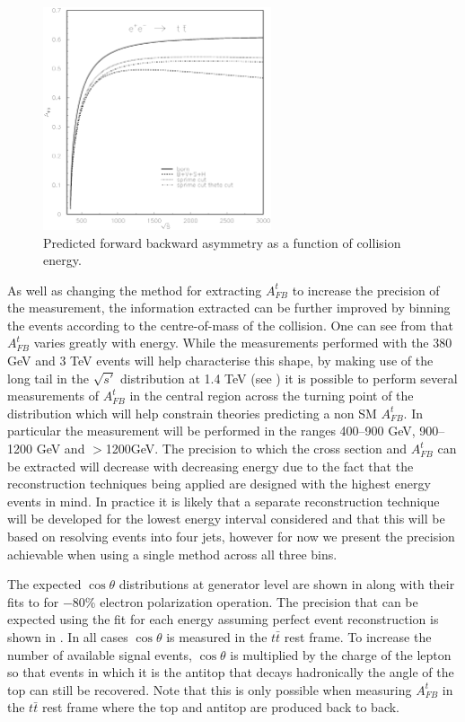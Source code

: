 \begin{figure}
  \centering
  \includegraphics[width=0.6\textwidth]{TopAnalysis/figures/asym-top.eps}
  \caption[Predicted forward backward asymmetry as a function of collision energy]{Predicted forward backward asymmetry as a function of collision energy\cite{Fleischer:2003kk}.}
  \label{fig:afbVEtheory}
\end{figure}

As well as changing the method for extracting $A_{FB}^t$ to increase the precision of the measurement, the information extracted can be further improved by binning the events according to the centre-of-mass of the collision. One can see from  that $A_{FB}^t$ varies greatly with energy. While the measurements performed with the 380 GeV and 3 TeV events will help characterise this shape, by making use of the long tail in the $\sqrt{s'}$ distribution at 1.4 TeV (see ) it is possible to perform several measurements of $A_{FB}^t$ in the central region across the turning point of the distribution which will help constrain theories predicting a non \ac{SM} $A_{FB}^t$. In particular the measurement will be performed in the ranges 400--900 GeV, 900--1200 GeV and $>$1200GeV. The precision to which the cross section  and $A_{FB}^t$ can be extracted will decrease with decreasing energy due to the fact that the reconstruction techniques being applied are designed with the highest energy events in mind. In practice it is likely that a separate reconstruction technique will be developed for the lowest energy interval considered and that this will be based on resolving events into four jets, however for now we present the precision achievable when using a single method across all three bins. 


The expected $\cos\theta$ distributions at generator level are shown in  along with their fits to  for $-$80\% electron polarization operation. The precision that can be expected using the fit for each energy assuming perfect event reconstruction is shown in . In all cases $\cos\theta$ is measured in the $t\bar{t}$ rest frame. To increase the number of available signal events, $\cos\theta$ is multiplied by the charge of the lepton so that events in which it is the antitop that decays hadronically the angle of the top can still be recovered. Note that this is only possible when measuring $A_{FB}^t$ in the $t\bar{t}$ rest frame where the top and antitop are produced back to back.

